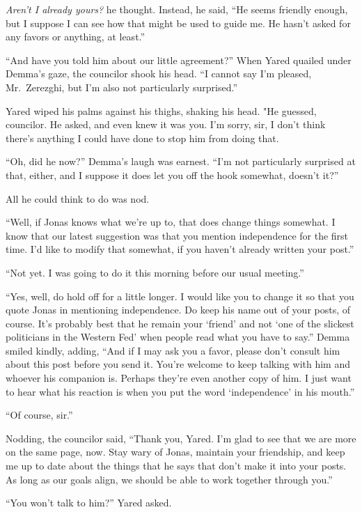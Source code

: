 \emph{Aren't I already yours?} he thought. Instead, he said, ``He seems friendly enough, but I suppose I can see how that might be used to guide me. He hasn't asked for any favors or anything, at least.''

``And have you told him about our little agreement?'' When Yared quailed under Demma's gaze, the councilor shook his head. ``I cannot say I'm pleased, Mr.~Zerezghi, but I'm also not particularly surprised.''

Yared wiped his palms against his thighs, shaking his head. "He guessed, councilor. He asked, and even knew it was you. I'm sorry, sir, I don't think there's anything I could have done to stop him from doing that.

``Oh, did he now?'' Demma's laugh was earnest. ``I'm not particularly surprised at that, either, and I suppose it does let you off the hook somewhat, doesn't it?''

All he could think to do was nod.

``Well, if Jonas knows what we're up to, that does change things somewhat. I know that our latest suggestion was that you mention independence for the first time. I'd like to modify that somewhat, if you haven't already written your post.''

``Not yet. I was going to do it this morning before our usual meeting.''

``Yes, well, do hold off for a little longer. I would like you to change it so that you quote Jonas in mentioning independence. Do keep his name out of your posts, of course. It's probably best that he remain your `friend' and not `one of the slickest politicians in the Western Fed' when people read what you have to say.'' Demma smiled kindly, adding, ``And if I may ask you a favor, please don't consult him about this post before you send it. You're welcome to keep talking with him and whoever his companion is. Perhaps they're even another copy of him. I just want to hear what his reaction is when you put the word `independence' in his mouth.''

``Of course, sir.''

Nodding, the councilor said, ``Thank you, Yared. I'm glad to see that we are more on the same page, now. Stay wary of Jonas, maintain your friendship, and keep me up to date about the things that he says that don't make it into your posts. As long as our goals align, we should be able to work together through you.''

``You won't talk to him?'' Yared asked.

